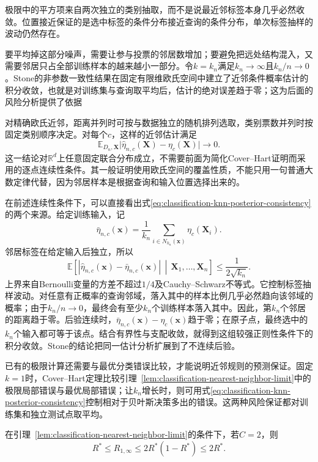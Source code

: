 极限中的平方项来自两次独立的类别抽取，而不是说最近邻标签本身几乎必然收敛。位置接近保证的是选中标签的条件分布接近查询的条件分布，单次标签抽样的波动仍然存在。

要平均掉这部分噪声，需要让参与投票的邻居数增加；要避免把远处结构混入，又需要邻居只占全部训练样本的越来越小一部分。令$k=k_n$满足$k_n\to\infty$且$k_n/n\to0$。Stone的非参数一致性结果在固定有限维欧氏空间中建立了近邻条件概率估计的积分收敛，也就是对训练集与查询取平均后，估计的绝对误差趋于零；这为后面的风险分析提供了依据

对精确欧氏近邻，距离并列时可按与数据独立的随机排列选取，类别票数并列时按固定类别顺序决定。对每个$c$，这样的近邻估计满足
\begin{equation}
  \mathbb{E}_{D_n,\bm{X}}
  \bigl|\hat\eta_{n,c}(\bm{X})-\eta_c(\bm{X})\bigr|
  \longrightarrow0.
  \label{eq:classification-knn-posterior-consistency}
\end{equation}
这一结论对$\mathbb{R}^d$上任意固定联合分布成立，不需要前面为简化Cover--Hart证明而采用的逐点连续性条件。其一般证明使用欧氏空间的覆盖性质，不能只用一句普通大数定律代替，因为邻居样本是根据查询和输入位置选择出来的。

在前述连续性条件下，可以直接看出式\eqref{eq:classification-knn-posterior-consistency}的两个来源。给定训练输入，记
\[
  \bar\eta_{n,c}(\bm{x})
  =\frac{1}{k_n}\sum_{i\in N_{k_n}(\bm{x})}\eta_c(\bm{X}_i).
\]
邻居标签在给定输入后独立，所以
\[
  \mathbb{E}\!\left[
    |\hat\eta_{n,c}(\bm{x})-\bar\eta_{n,c}(\bm{x})|
    \,\middle|\,\bm{X}_1,\ldots,\bm{X}_n
  \right]\leq\frac{1}{2\sqrt{k_n}}.
\]
上界来自Bernoulli变量的方差不超过$1/4$及Cauchy--Schwarz不等式。它控制标签抽样波动。对任意有正概率的查询邻域，落入其中的样本比例几乎必然趋向该邻域的概率；由于$k_n/n\to0$，最终会有至少$k_n$个训练样本落入其中。因此，第$k_n$个邻居的距离趋于零。后验连续时，$\bar\eta_{n,c}(\bm{x})-\eta_c(\bm{x})$趋于零；在原子点，最终选中的$k_n$个输入都可等于该点。结合有界性与支配收敛，就得到这组较强正则性条件下的积分收敛。Stone的结论把同一估计分析扩展到了不连续后验。

已有的极限计算还需要与最优分类错误比较，才能说明近邻规则的预测保证。固定$k=1$时，Cover--Hart定理比较引理~\ref{lem:classification-nearest-neighbor-limit}中的极限局部错误与最优局部错误；让$k_n$增长时，则可用式\eqref{eq:classification-knn-posterior-consistency}控制相对于贝叶斯决策多出的错误。这两种风险保证都对训练集和独立测试点取平均。

\begin{theorem}
  \label{thm:classification-cover-hart-binary}
  在引理~\ref{lem:classification-nearest-neighbor-limit}的条件下，若$C=2$，则
  \begin{equation}
    R^\ast\leq R_{1,\infty}
    \leq2R^\ast(1-R^\ast)\leq2R^\ast.
    \label{eq:classification-cover-hart-binary}
  \end{equation}
\end{theorem}

